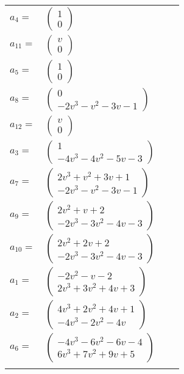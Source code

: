 \documentclass[1p]{elsarticle_modified}
\theoremstyle{definition}
\begin{document}
\begin{tabular}{m{7pt} m{180pt} m{7pt} m{180pt} }
\flushright $a_{4}=$&$\begin{pmatrix}1\\0\end{pmatrix}$ \\
\flushright $a_{11}=$&$\begin{pmatrix}v\\0\end{pmatrix}$ \\
\flushright $a_{5}=$&$\begin{pmatrix}1\\0\end{pmatrix}$ \\
\flushright $a_{8}=$&$\begin{pmatrix}0\\-2 v^3- v^2-3 v-1\end{pmatrix}$ \\
\flushright $a_{12}=$&$\begin{pmatrix}v\\0\end{pmatrix}$ \\
\flushright $a_{3}=$&$\begin{pmatrix}1\\-4 v^3-4 v^2-5 v-3\end{pmatrix}$ \\
\flushright $a_{7}=$&$\begin{pmatrix}2 v^3+v^2+3 v+1\\-2 v^3- v^2-3 v-1\end{pmatrix}$ \\
\flushright $a_{9}=$&$\begin{pmatrix}2 v^2+v+2\\-2 v^3-3 v^2-4 v-3\end{pmatrix}$ \\
\flushright $a_{10}=$&$\begin{pmatrix}2 v^2+2 v+2\\-2 v^3-3 v^2-4 v-3\end{pmatrix}$ \\
\flushright $a_{1}=$&$\begin{pmatrix}-2 v^2- v-2\\2 v^3+3 v^2+4 v+3\end{pmatrix}$ \\
\flushright $a_{2}=$&$\begin{pmatrix}4 v^3+2 v^2+4 v+1\\-4 v^3-2 v^2-4 v\end{pmatrix}$ \\
\flushright $a_{6}=$&$\begin{pmatrix}-4 v^3-6 v^2-6 v-4\\6 v^3+7 v^2+9 v+5\end{pmatrix}$\\&\end{tabular}
\end{document}
